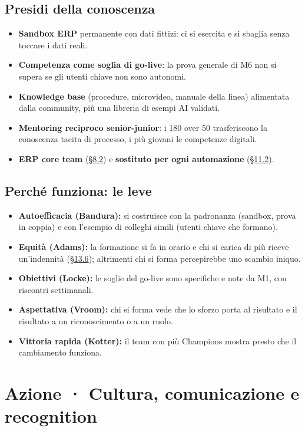 \documentclass[11pt,a4paper]{article}
\begin{document}
\subsection{Presidi della conoscenza}\label{sec:12.2}
\begin{itemize}
\item \textbf{Sandbox ERP} permanente con dati fittizi: ci si esercita e si sbaglia senza toccare i dati reali.
\item \textbf{Competenza come soglia di go-live}: la prova generale di M6 non si supera se gli utenti chiave non sono autonomi.
\item \textbf{Knowledge base} (procedure, microvideo, manuale della linea) alimentata dalla community, più una libreria di esempi AI validati.
\item \textbf{Mentoring reciproco senior-junior}: i 180 over 50 trasferiscono la conoscenza tacita di processo, i più giovani le competenze digitali.
\item \textbf{ERP core team} (\hyperref[sec:8.2]{\S8.2}) e \textbf{sostituto per ogni automazione} (\hyperref[sec:11.2]{\S11.2}).
\end{itemize}

\subsection{Perché funziona: le leve}\label{sec:12.3}
\begin{itemize}
\item \textbf{Autoefficacia (Bandura):} si costruisce con la padronanza (sandbox, prova in coppia) e con l'esempio di colleghi simili (utenti chiave che formano).
\item \textbf{Equità (Adams):} la formazione si fa in orario e chi si carica di più riceve un'indennità (\hyperref[sec:13.6]{\S13.6}); altrimenti chi si forma percepirebbe uno scambio iniquo.
\item \textbf{Obiettivi (Locke):} le soglie del go-live sono specifiche e note da M1, con riscontri settimanali.
\item \textbf{Aspettativa (Vroom):} chi si forma vede che lo sforzo porta al risultato e il risultato a un riconoscimento o a un ruolo.
\item \textbf{Vittoria rapida (Kotter):} il team con più Champions mostra presto che il cambiamento funziona.
\end{itemize}

\section{Azione · Cultura, comunicazione e recognition}\label{sec:13}
\end{document}
